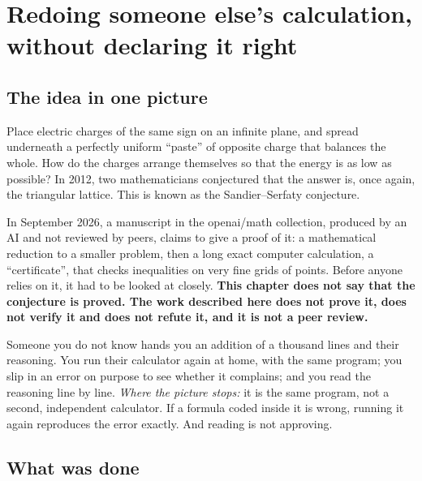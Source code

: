 \chapter[Redoing someone else's calculation]{Redoing someone else's calculation, without declaring it right}


\section*{The idea in one picture}

Place electric charges of the same sign on an infinite plane, and spread underneath a perfectly
uniform ``paste'' of opposite charge that balances the whole. How do the charges arrange
themselves so that the energy is as low as possible? In 2012, two mathematicians conjectured
that the answer is, once again, the triangular lattice. This is known as the Sandier--Serfaty
conjecture.

In September 2026, a manuscript in the openai/math collection, produced by an AI and not
reviewed by peers, claims to give a proof of it: a mathematical reduction to a smaller problem,
then a long exact computer calculation, a ``certificate'', that checks inequalities on very fine
grids of points. Before anyone relies on it, it had to be looked at closely. \textbf{This chapter
does not say that the conjecture is proved. The work described here does not prove it, does not
verify it and does not refute it, and it is not a peer review.}

\begin{analogie}
Someone you do not know hands you an addition of a thousand lines and their reasoning. You run
their calculator again at home, with the same program; you slip in an error on purpose to see
whether it complains; and you read the reasoning line by line. \emph{Where the picture stops:}
it is the same program, not a second, independent calculator. If a formula coded inside it is
wrong, running it again reproduces the error exactly. And reading is not approving.
\end{analogie}

\section*{What was done}


